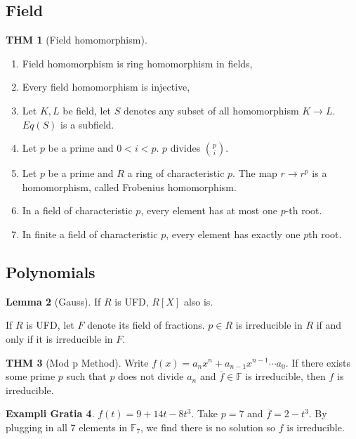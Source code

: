 \documentclass[twocolumn]{article}
\newcommand{\F}{\mathbb{F}}
\theoremstyle{definition}
\newtheorem{thm}{THM}
\newtheorem{lemma}[thm]{Lemma}
\newtheorem{example}[thm]{Exampli Gratia}
\theoremstyle{remark}
\begin{document}
\subsection{Field}

\begin{thm}[Field homomorphism]
	\begin{enumerate}
		\item Field homomorphism is ring homomorphism in fields,
		\item Every field homomorphism is injective,
		\item Let $K, L$ be field, let $S$ denotes any subset of all homomorphism $K \rightarrow L$. $Eq(S)$ is a subfield.
		\item Let $p$ be a prime and $0 < i < p$. $p $ divides $ \binom{p}{i}$.
		\item Let $p$ be a prime and $R$ a ring of characteristic $p$. 
			The map $r \rightarrow r^p$ is a homomorphism, called Frobenius homomorphism.
		\item In a field of characteristic $p$, every element has at most one $p$-th root.
		\item In finite a field of characteristic $p$, every element has exactly one $p$th root.
	\end{enumerate}
\end{thm}

\subsection{Polynomials}

\begin{lemma}[Gauss]
	If $R$ is UFD, $R[X]$ also is.

	If $R$ is UFD, let $F$ denote its field of fractions. 
	$p \in R$ is irreducible in $R$ if and only if it is irreducible in $F$.
\end{lemma}

\begin{thm}[Mod p Method]
	Write $f(x) = a_n x^n + a_{n-1}x^{n-1} \cdots a_0$.
	If there exists some prime $p$ such that $p$ does not divide $a_n$ and $\overline{f} \in \F$ is irreducible, then $f$ is irreducible.
\end{thm}

\begin{example}
	$f(t) = 9 + 14t - 8t^3$. Take $p = 7$ and $\overline{f}= 2 -t^3$. By plugging in all 7 elements in $\F_7$, we find there is no solution so $f$ is irreducible.
\end{example}
\end{document}
